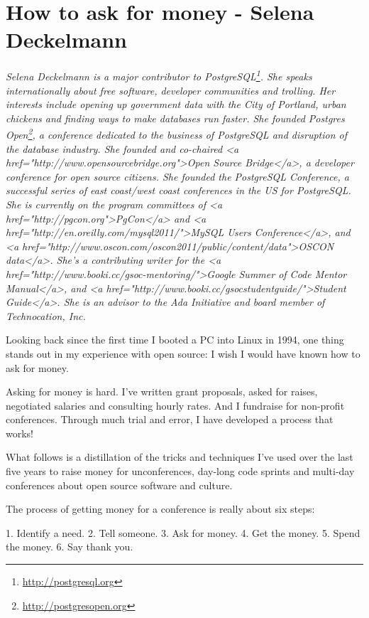 \chapter{How to ask for money - Selena Deckelmann}

\textit{Selena Deckelmann is a major contributor to PostgreSQL\footnote{\url{http://postgresql.org}}. She speaks internationally about free software, developer communities and trolling. Her interests include opening up government data with the City of Portland, urban chickens and finding ways to make databases run faster.
\newline
She founded Postgres Open\footnote{\url{http://postgresopen.org}}, a conference dedicated to the business of PostgreSQL and disruption of the database industry. She founded and co-chaired <a href="http://www.opensourcebridge.org">Open Source Bridge</a>, a developer conference for open source citizens.  She founded the PostgreSQL Conference, a successful series of east coast/west coast conferences in the US for PostgreSQL. She is currently on the program committees of <a href="http://pgcon.org">PgCon</a> and <a href="http://en.oreilly.com/mysql2011/">MySQL Users Conference</a>, and <a href="http://www.oscon.com/oscon2011/public/content/data">OSCON data</a>. She's a contributing writer for the <a href="http://www.booki.cc/gsoc-mentoring/">Google Summer of Code Mentor Manual</a>, and <a href="http://www.booki.cc/gsocstudentguide/">Student Guide</a>. She is an advisor to the Ada Initiative and board member of Technocation, Inc.}

Looking back since the first time I booted a PC into Linux in 1994, one thing stands out in my experience with open source: I wish I would have known how to ask for money.

Asking for money is hard. I've written grant proposals, asked for raises, negotiated salaries and consulting hourly rates. And I fundraise for non-profit conferences. Through much trial and error, I have developed a process that works!

What follows is a distillation of the tricks and techniques I’ve used over the last five years to raise money for unconferences, day-long code sprints and multi-day conferences about open source software and culture.

The process of getting money for a conference is really about six steps: 

1. Identify a need. 
2. Tell someone. 
3. Ask for money.
4. Get the money.
5. Spend the money. 
6. Say thank you.

